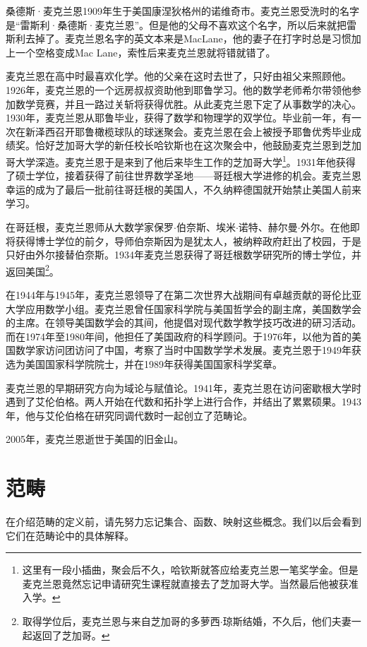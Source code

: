 \documentclass{article}
\begin{document}
桑德斯·麦克兰恩1909年生于美国康涅狄格州的诺维奇市。麦克兰恩受洗时的名字是“雷斯利·桑德斯·麦克兰恩”。但是他的父母不喜欢这个名字，所以后来就把雷斯利去掉了。麦克兰恩名字的英文本来是MacLane，他的妻子在打字时总是习惯加上一个空格变成Mac Lane，索性后来麦克兰恩就将错就错了。

麦克兰恩在高中时最喜欢化学。他的父亲在这时去世了，只好由祖父来照顾他。1926年，麦克兰恩的一个远房叔叔资助他到耶鲁学习。他的数学老师希尔带领他参加数学竞赛，并且一路过关斩将获得优胜。从此麦克兰恩下定了从事数学的决心。1930年，麦克兰恩从耶鲁毕业，获得了数学和物理学的双学位。毕业前一年，有一次在新泽西召开耶鲁橄榄球队的球迷聚会。麦克兰恩在会上被授予耶鲁优秀毕业成绩奖\cite{Wiki-Mac-Lane}。恰好芝加哥大学的新任校长哈钦斯也在这次聚会中，他鼓励麦克兰恩到芝加哥大学深造。麦克兰恩于是来到了他后来毕生工作的芝加哥大学\footnote{这里有一段小插曲，聚会后不久，哈钦斯就答应给麦克兰恩一笔奖学金。但是麦克兰恩竟然忘记申请研究生课程就直接去了芝加哥大学。当然最后他被获准入学。}。1931年他获得了硕士学位，接着获得了前往世界数学圣地——哥廷根大学进修的机会。麦克兰恩幸运的成为了最后一批前往哥廷根的美国人，不久纳粹德国就开始禁止美国人前来学习。

在哥廷根，麦克兰恩师从大数学家保罗$\cdot$伯奈斯、埃米$\cdot$诺特、赫尔曼$\cdot$外尔。在他即将获得博士学位的前夕，导师伯奈斯因为是犹太人，被纳粹政府赶出了校园，于是只好由外尔接替伯奈斯。1934年麦克兰恩获得了哥廷根数学研究所的博士学位，并返回美国\footnote{取得学位后，麦克兰恩与来自芝加哥的多萝西$\cdot$琼斯结婚，不久后，他们夫妻一起返回了芝加哥。}。

在1944年与1945年，麦克兰恩领导了在第二次世界大战期间有卓越贡献的哥伦比亚大学应用数学小组。麦克兰恩曾任国家科学院与美国哲学会的副主席，美国数学会的主席。在领导美国数学会的其间，他提倡对现代数学教学技巧改进的研习活动。而在1974年至1980年间，他担任了美国政府的科学顾问。于1976年，以他为首的美国数学家访问团访问了中国，考察了当时中国数学学术发展。麦克兰恩于1949年获选为美国国家科学院院士，并在1989年获得美国国家科学奖章。

麦克兰恩的早期研究方向为域论与赋值论。1941年，麦克兰恩在访问密歇根大学时遇到了艾伦伯格。两人开始在代数和拓扑学上进行合作，并结出了累累硕果。1943年，他与艾伦伯格在研究同调代数时一起创立了范畴论。

2005年，麦克兰恩逝世于美国的旧金山。

\section{范畴}

在介绍范畴的定义前，请先努力忘记集合、函数、映射这些概念。我们以后会看到它们在范畴论中的具体解释。
\end{document}
